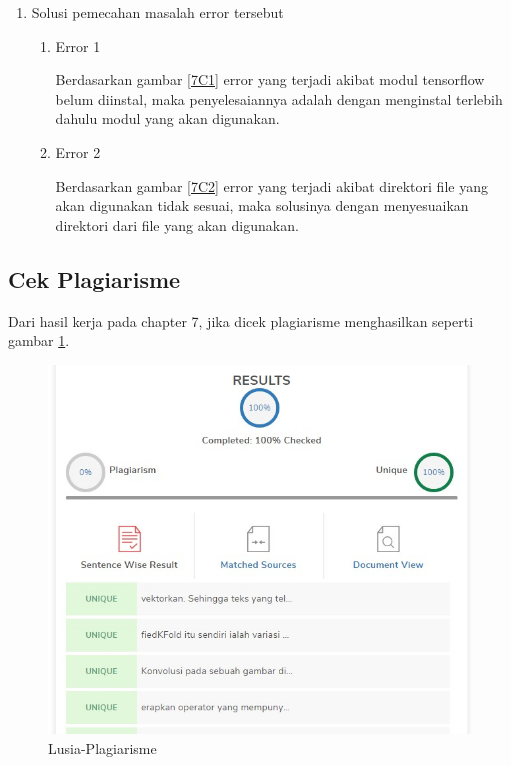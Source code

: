 \begin{enumerate}
\begin{enumerate}
\begin{itemize}
			\end{itemize}
		\end{enumerate}
	\item Solusi pemecahan masalah error tersebut
		\begin{enumerate}
		\item Error 1
			\par Berdasarkan gambar \ref{7C1} error yang terjadi akibat modul tensorflow belum diinstal, maka penyelesaiannya adalah dengan menginstal terlebih dahulu modul yang akan digunakan.
		\item Error 2
			\par Berdasarkan gambar \ref{7C2} error yang terjadi akibat direktori file yang akan digunakan tidak sesuai, maka solusinya dengan menyesuaikan direktori dari file yang akan digunakan.
		\end{enumerate}
\end{enumerate}

\subsection{Cek Plagiarisme}
\par Dari hasil kerja pada chapter 7, jika dicek plagiarisme menghasilkan seperti gambar \ref{7D1}.
		\begin{figure}[!hbtp]
		\centering
		\includegraphics[scale=0.4]{figures/pc7.jpg}
		\caption{Lusia-Plagiarisme}
		\label{7D1}
		\end{figure}




